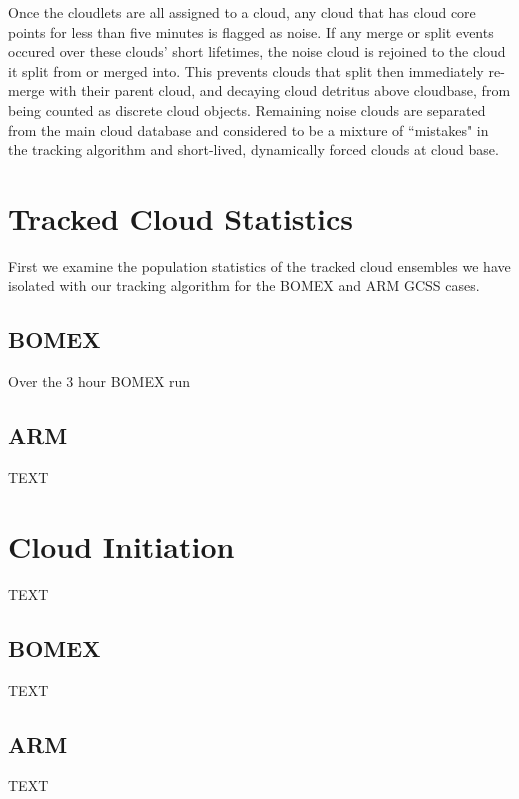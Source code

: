 \documentclass[acp]{copernicus}
\begin{document}
Once the cloudlets are all assigned to a cloud, any cloud that has cloud core points for less than five minutes is flagged as noise.  If any merge or split 
events occured over these clouds' short lifetimes, the noise cloud is rejoined 
to the cloud it split from or merged into.  This prevents clouds that split
then immediately re-merge with their parent cloud, and decaying cloud detritus 
above cloudbase, from being counted as discrete cloud objects.  Remaining 
noise clouds are separated from the main cloud database and considered to be a mixture of ``mistakes" in the tracking algorithm and short-lived, dynamically forced clouds at cloud base.


\section{Tracked Cloud Statistics}

First we examine the population statistics of the tracked cloud ensembles we 
have isolated with our tracking algorithm for the BOMEX and ARM GCSS cases.


\subsection{BOMEX}

Over the 3 hour BOMEX run



\subsection{ARM}

TEXT


\section{Cloud Initiation}
TEXT

\subsection{BOMEX}
TEXT

\subsection{ARM}
TEXT
\end{document}
